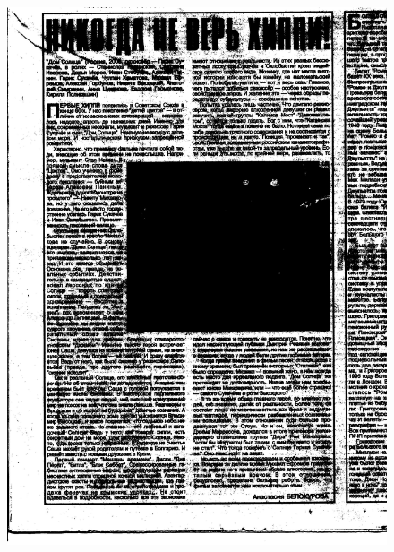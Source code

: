 \documentclass{book}
\begin{document}
\begin{figure}[H]
\begin{center}
\includegraphics[scale=0.075]{images/1g_binary.jpg}

\end{center}
\end{figure}
\end{document}

